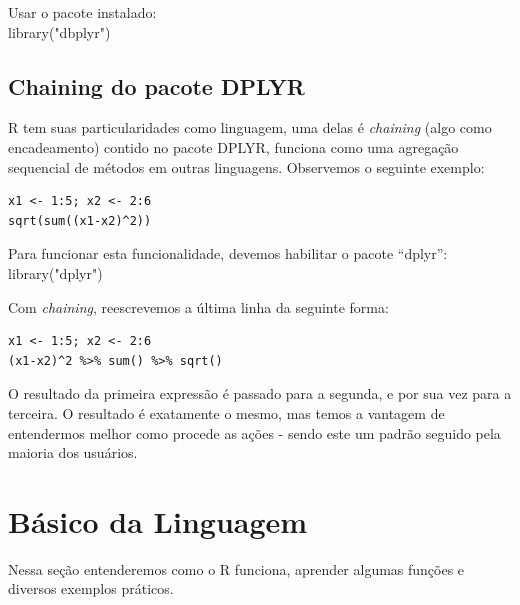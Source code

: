 \documentclass[a4paper,11pt]{article}
\begin{document}
Usar o pacote instalado: \\
{\ttfamily library("dbplyr")}

\subsection{Chaining do pacote DPLYR}
R tem suas particularidades como linguagem, uma delas é \textit{chaining} (algo como encadeamento) contido no pacote DPLYR, funciona como uma agregação sequencial de métodos em outras linguagens. Observemos o seguinte exemplo:
\begin{lstlisting}
x1 <- 1:5; x2 <- 2:6
sqrt(sum((x1-x2)^2))
\end{lstlisting}

\begin{theo}[]{}
	Para funcionar esta funcionalidade, devemos habilitar o pacote ``dplyr'': \\
	{\ttfamily library("dplyr")}
\end{theo}

Com \textit{chaining}, reescrevemos a última linha da seguinte forma:
\begin{lstlisting}
x1 <- 1:5; x2 <- 2:6
(x1-x2)^2 %>% sum() %>% sqrt()
\end{lstlisting}

O resultado da primeira expressão é passado para a segunda, e por sua vez para a terceira. O resultado é exatamente o mesmo, mas temos a vantagem de entendermos melhor como procede as ações - sendo este um padrão seguido pela maioria dos usuários.

\section{Básico da Linguagem}
Nessa seção entenderemos como o R funciona, aprender algumas funções e diversos exemplos práticos.
\end{document}
